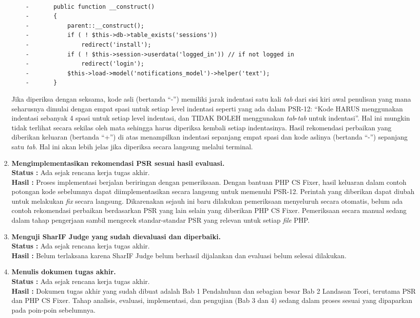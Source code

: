 \documentclass[a4paper,twoside]{article}
\begin{document}
\begin{enumerate}
\begin{lstlisting}[frame=single,language=diff]
		
	-		public function __construct()
	-		{
	-			parent::__construct();
	-			if ( ! $this->db->table_exists('sessions'))
	-				redirect('install');
	-			if ( ! $this->session->userdata('logged_in')) // if not logged in
	-				redirect('login');
	-			$this->load->model('notifications_model')->helper('text');
	-		}
\end{lstlisting}
			Jika diperiksa dengan seksama, kode asli (bertanda ``-'') memiliki jarak indentasi satu kali \textit{tab} dari sisi kiri awal penulisan yang mana seharusnya dimulai dengan empat spasi untuk setiap level indentasi seperti yang ada dalam PSR-12: ``Kode HARUS menggunakan indentasi sebanyak 4 spasi untuk setiap level indentasi, dan TIDAK BOLEH menggunakan \textit{tab}-\textit{tab} untuk indentasi''. Hal ini mungkin tidak terlihat secara sekilas oleh mata sehingga harus diperiksa kembali setiap indentasinya. Hasil rekomendasi perbaikan yang diberikan keluaran (bertanda ``+'') di atas menampilkan indentasi sepanjang empat spasi dan kode aslinya (bertanda ``-'') sepanjang satu \textit{tab}. Hal ini akan lebih jelas jika diperiksa secara langsung melalui terminal.   
			
			\item \textbf{Mengimplementasikan rekomendasi PSR sesuai hasil evaluasi.}\\
			{\bf Status :} Ada sejak rencana kerja tugas akhir.\\
			{\bf Hasil :} Proses implementasi berjalan beriringan dengan pemeriksaan. Dengan bantuan PHP CS Fixer, hasil keluaran dalam contoh potongan kode sebelumnya dapat diimplementasikan secara langsung untuk memenuhi PSR-12. Perintah yang diberikan dapat diubah untuk melakukan \textit{fix} secara langsung. Dikarenakan sejauh ini baru dilakukan pemeriksaan menyeluruh secara otomatis, belum ada contoh rekomendasi perbaikan berdasarkan PSR yang lain selain yang diberikan PHP CS Fixer. Pemeriksaan secara manual sedang dalam tahap pengerjaan sambil mengecek standar-standar PSR yang relevan untuk setiap \textit{file} PHP.
			
			\item \textbf{Menguji SharIF Judge yang sudah dievaluasi dan diperbaiki.}\\
			{\bf Status :} Ada sejak rencana kerja tugas akhir.\\
			{\bf Hasil :} Belum terlaksana karena SharIF Judge belum berhasil dijalankan dan evaluasi belum selesai dilakukan. 
			
			\item \textbf{Menulis dokumen tugas akhir.}\\
			{\bf Status :} Ada sejak rencana kerja tugas akhir.\\
			{\bf Hasil :} Dokumen tugas akhir yang sudah dibuat adalah Bab 1 Pendahuluan dan sebagian besar Bab 2 Landasan Teori, terutama PSR dan PHP CS Fixer. Tahap analisis, evaluasi, implementasi, dan pengujian (Bab 3 dan 4) sedang dalam proses sesuai yang dipaparkan pada poin-poin sebelumnya.  
			
		\end{enumerate}
		
\end{document}

